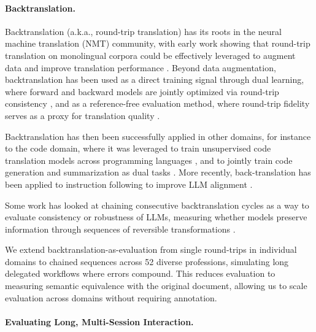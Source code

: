 \documentclass{article} %
\begin{document}
\paragraph{Backtranslation.}

Backtranslation (a.k.a., round-trip translation) has its roots in the neural machine translation (NMT) community, with early work showing that round-trip translation on monolingual corpora could be effectively leveraged to augment data and improve translation performance \cite{Sennrich2015ImprovingNM,Lample2017UnsupervisedMT}. Beyond data augmentation, backtranslation has been used as a direct training signal through dual learning, where forward and backward models are jointly optimized via round-trip consistency \cite{He2016DualLF,Hoang2018IterativeBF}, and as a reference-free evaluation method, where round-trip fidelity serves as a proxy for translation quality \cite{Somers2005RoundtripTW,Zhuo2022RethinkingRT}.

Backtranslation has then been successfully applied in other domains, for instance to the code domain, where it was leveraged to train unsupervised code translation models across programming languages \cite{Lachaux2020UnsupervisedTO,Rozière2021LeveragingAU}, and to jointly train code generation and summarization as dual tasks \cite{Wei2019CodeGA}. More recently, back-translation has been applied to instruction following to improve LLM alignment \cite{Li2023SelfAlignmentWI,Nguyen2024BetterAW}.

Some work has looked at chaining consecutive backtranslation cycles as a way to evaluate consistency or robustness of LLMs, measuring whether models preserve information through sequences of reversible transformations \cite{Hong2025ConsistencyCheckerTE,Min2023BeyondAE,Allamanis2024UnsupervisedEO,Maveli2026CanLC}.

We extend backtranslation-as-evaluation \cite{Zhuo2022RethinkingRT,Allamanis2024UnsupervisedEO} from single round-trips in individual domains to chained sequences across 52 diverse professions, simulating long delegated workflows where errors compound. This reduces evaluation to measuring semantic equivalence with the original document, allowing us to scale evaluation across domains without requiring annotation.

\paragraph{Evaluating Long, Multi-Session Interaction.}
\end{document}
